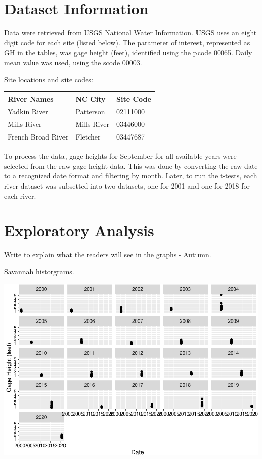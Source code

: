 \documentclass[
  12pt,
]{article}
\begin{document}
\newpage

\hypertarget{dataset-information}{%
\section{Dataset Information}\label{dataset-information}}

Data were retrieved from USGS National Water Information. USGS uses an
eight digit code for each site (listed below). The parameter of
interest, represented as GH in the tables, was gage height (feet),
identified using the pcode 00065. Daily mean value was used, using the
scode 00003.

Site locations and site codes:

\begin{longtable}[]{@{}lll@{}}
\toprule
River Names & NC City & Site Code\tabularnewline
\midrule
\endhead
Yadkin River & Patterson & 02111000\tabularnewline
Mills River & Mills River & 03446000\tabularnewline
French Broad River & Fletcher & 03447687\tabularnewline
\bottomrule
\end{longtable}

To process the data, gage heights for September for all available years
were selected from the raw gage height data. This was done by converting
the raw date to a recognized date format and filtering by month. Later,
to run the t-tests, each river dataset was subsetted into two datasets,
one for 2001 and one for 2018 for each river.

\newpage

\hypertarget{exploratory-analysis}{%
\section{Exploratory Analysis}\label{exploratory-analysis}}

Write to explain what the readers will see in the graphs - Autumn.

Savannah historgrams.

\includegraphics{Project_Template_files/figure-latex/Plot1-1.pdf}
\end{document}

